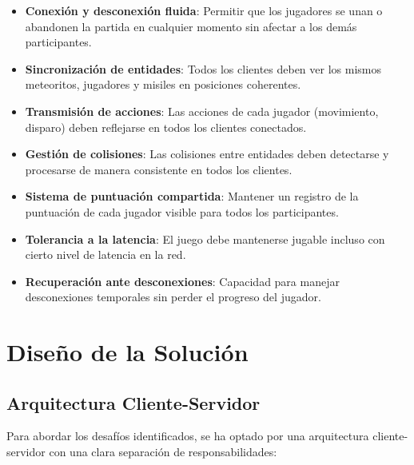 \documentclass[12pt,letterpaper]{article}
\begin{document}
\begin{itemize}
    \item \textbf{Conexión y desconexión fluida}: Permitir que los jugadores se unan o abandonen la partida en cualquier momento sin afectar a los demás participantes.
    
    \item \textbf{Sincronización de entidades}: Todos los clientes deben ver los mismos meteoritos, jugadores y misiles en posiciones coherentes.
    
    \item \textbf{Transmisión de acciones}: Las acciones de cada jugador (movimiento, disparo) deben reflejarse en todos los clientes conectados.
    
    \item \textbf{Gestión de colisiones}: Las colisiones entre entidades deben detectarse y procesarse de manera consistente en todos los clientes.
    
    \item \textbf{Sistema de puntuación compartida}: Mantener un registro de la puntuación de cada jugador visible para todos los participantes.
    
    \item \textbf{Tolerancia a la latencia}: El juego debe mantenerse jugable incluso con cierto nivel de latencia en la red.
    
    \item \textbf{Recuperación ante desconexiones}: Capacidad para manejar desconexiones temporales sin perder el progreso del jugador.
\end{itemize}

\section{Diseño de la Solución}

\subsection{Arquitectura Cliente-Servidor}

Para abordar los desafíos identificados, se ha optado por una arquitectura cliente-servidor con una clara separación de responsabilidades:
\end{document}
